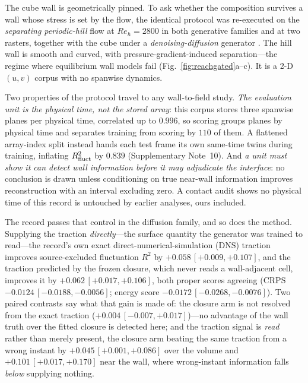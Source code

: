 The cube wall is geometrically pinned. To ask whether the composition survives a wall whose
stress is set by the flow, the identical protocol was re-executed on the \emph{separating
periodic-hill} flow \cite{frohlich2005highly,breuer2009hill,xiao2020hills} at $Re_h=2800$ in both
generative families and at two rasters, together with the cube under a \emph{denoising-diffusion}
generator \cite{ho2020ddpm}. The hill wall is smooth and curved, with
pressure-gradient-induced separation---the regime where equilibrium wall models fail
(Fig.~\ref{fig:reachgated}a--c). It is a 2-D $(u,v)$ corpus with no spanwise dynamics.

Two properties of the protocol travel to any wall-to-field study.
\emph{The evaluation unit is the physical time, not the stored array}: this corpus stores three
spanwise planes per physical time, correlated up to $0.996$, so scoring groups planes by physical
time and separates training from scoring by $110$ of them. A flattened array-index split instead
hands each test frame its own same-time twins during training, inflating $R^2_{\rm fluct}$ by
$0.839$ (Supplementary Note~10). And \emph{a unit must show it can detect wall information before
it may adjudicate the interface}: no conclusion is drawn unless conditioning on true near-wall
information improves reconstruction with an interval excluding zero. A contact audit
shows no physical time of this record is untouched by earlier analyses, ours included.

The record passes that control in the diffusion family, and so does the method. Supplying the
traction \emph{directly}---the surface quantity the generator was trained to read---the record's
own exact direct-numerical-simulation (DNS) traction improves source-excluded fluctuation $R^2$
by $+0.058\,[+0.009,+0.107]$, and the traction predicted by the frozen closure, which never reads
a wall-adjacent cell, improves it by $+0.062\,[+0.017,+0.106]$, both proper scores agreeing
(CRPS $-0.0124\,[-0.0188,-0.0056]$; energy score $-0.0172\,[-0.0268,-0.0076]$). Two paired
contrasts say what that gain is made of: the closure arm is not resolved from the exact
traction ($+0.004\,[-0.007,+0.017]$)---no advantage of the wall truth over the fitted closure
is detected here; and the traction signal is \emph{read} rather than merely present, the
closure arm beating the same traction from a wrong instant by $+0.045\,[+0.001,+0.086]$ over the
volume and $+0.101\,[+0.017,+0.170]$ near the wall, where wrong-instant information falls
\emph{below} supplying nothing.

